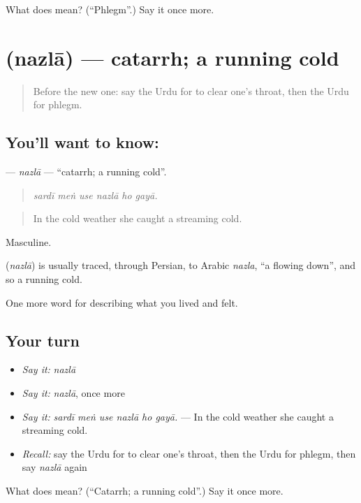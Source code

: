 \begin{tcolorbox}[breakable,colback=teal!4,colframe=teal!35!black,title={Before you move on}]
What does  mean? (\textquotedblleft{}Phlegm\textquotedblright{}.) Say it once more.
\end{tcolorbox}
\section[\texorpdfstring{\ur{نزلہ} (nazlā)}{نزلہ (nazlā)}]{ (nazlā) — catarrh; a running cold}

\label{lesson:UR-C469-nazla}



\begin{quote}
Before the new one: say the Urdu for to clear one's throat, then the Urdu for phlegm.
\end{quote}

\subsection*{You'll want to know: }
\textbf{} — \emph{nazlā} — \textquotedblleft{}catarrh; a running cold\textquotedblright{}.

\begin{quote}
     
\end{quote}

\begin{quote}
\emph{sardī meṅ use nazlā ho gayā.}
\end{quote}

\begin{quote}
In the cold weather she caught a streaming cold.
\end{quote}

Masculine.

\begin{cousinweb}
\textbf{} (\emph{nazlā}) is usually traced, through Persian, to Arabic \emph{nazla}, \textquotedblleft{}a flowing down\textquotedblright{}, and so a running cold.
\end{cousinweb}

\begin{grammarlens}[title={What you've built}]
One more word for describing what you lived and felt.
\end{grammarlens}

\subsection*{Your turn}
\begin{itemize}
\raggedright
  \item \emph{Say it:} \emph{nazlā}
  \item \emph{Say it:} \emph{nazlā}, once more
  \item \emph{Say it:} \emph{sardī meṅ use nazlā ho gayā.} — In the cold weather she caught a streaming cold.
  \item \emph{Recall:} say the Urdu for to clear one's throat, then the Urdu for phlegm, then say \emph{nazlā} again
\end{itemize}

\begin{tcolorbox}[breakable,colback=teal!4,colframe=teal!35!black,title={Before you move on}]
What does  mean? (\textquotedblleft{}Catarrh; a running cold\textquotedblright{}.) Say it once more.
\end{tcolorbox}
